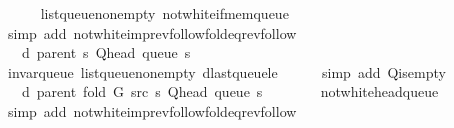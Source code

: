 \begin{isabellebody}
\ \ \ \ \isamarkupfalse%
\ list{\isacharunderscore}{\kern0pt}queue{\isacharunderscore}{\kern0pt}non{\isacharunderscore}{\kern0pt}empty\ not{\isacharunderscore}{\kern0pt}white{\isacharunderscore}{\kern0pt}if{\isacharunderscore}{\kern0pt}mem{\isacharunderscore}{\kern0pt}queue\isanewline
\ \ \ \ \isamarkupfalse%
\ {\isacharparenleft}{\kern0pt}simp\ add{\isacharcolon}{\kern0pt}\ not{\isacharunderscore}{\kern0pt}white{\isacharunderscore}{\kern0pt}imp{\isacharunderscore}{\kern0pt}rev{\isacharunderscore}{\kern0pt}follow{\isacharunderscore}{\kern0pt}fold{\isacharunderscore}{\kern0pt}eq{\isacharunderscore}{\kern0pt}rev{\isacharunderscore}{\kern0pt}follow{\isacharparenright}{\kern0pt}\isanewline
\ \ \isamarkupfalse%
\ \isamarkupfalse%
\ {\isachardoublequoteopen}{\isachardot}{\kern0pt}{\isachardot}{\kern0pt}{\isachardot}{\kern0pt}\ {\isasymle}\ d\ {\isacharparenleft}{\kern0pt}parent\ s{\isacharparenright}{\kern0pt}\ {\isacharparenleft}{\kern0pt}Q{\isacharunderscore}{\kern0pt}head\ {\isacharparenleft}{\kern0pt}queue\ s{\isacharparenright}{\kern0pt}{\isacharparenright}{\kern0pt}\ {\isacharplus}{\kern0pt}\ {}{\isachardoublequoteclose}\isanewline
\ \ \ \ \isamarkupfalse%
\ invar{\isacharunderscore}{\kern0pt}queue\ list{\isacharunderscore}{\kern0pt}queue{\isacharunderscore}{\kern0pt}non{\isacharunderscore}{\kern0pt}empty\ d{\isacharunderscore}{\kern0pt}last{\isacharunderscore}{\kern0pt}queue{\isacharunderscore}{\kern0pt}le\isanewline
\ \ \ \ \isamarkupfalse%
\ {\isacharparenleft}{\kern0pt}simp\ add{\isacharcolon}{\kern0pt}\ Q{\isachardot}{\kern0pt}is{\isacharunderscore}{\kern0pt}empty{\isacharparenright}{\kern0pt}\isanewline
\ \ \isamarkupfalse%
\ \isamarkupfalse%
\ {\isachardoublequoteopen}{\isachardot}{\kern0pt}{\isachardot}{\kern0pt}{\isachardot}{\kern0pt}\ {\isacharequal}{\kern0pt}\ d\ {\isacharparenleft}{\kern0pt}parent\ {\isacharparenleft}{\kern0pt}fold\ G\ src\ s{\isacharparenright}{\kern0pt}{\isacharparenright}{\kern0pt}\ {\isacharparenleft}{\kern0pt}Q{\isacharunderscore}{\kern0pt}head\ {\isacharparenleft}{\kern0pt}queue\ s{\isacharparenright}{\kern0pt}{\isacharparenright}{\kern0pt}\ {\isacharplus}{\kern0pt}\ {}{\isachardoublequoteclose}\isanewline
\ \ \ \ \isamarkupfalse%
\ not{\isacharunderscore}{\kern0pt}white{\isacharunderscore}{\kern0pt}head{\isacharunderscore}{\kern0pt}queue\isanewline
\ \ \ \ \isamarkupfalse%
\ {\isacharparenleft}{\kern0pt}simp\ add{\isacharcolon}{\kern0pt}\ not{\isacharunderscore}{\kern0pt}white{\isacharunderscore}{\kern0pt}imp{\isacharunderscore}{\kern0pt}rev{\isacharunderscore}{\kern0pt}follow{\isacharunderscore}{\kern0pt}fold{\isacharunderscore}{\kern0pt}eq{\isacharunderscore}{\kern0pt}rev{\isacharunderscore}{\kern0pt}follow{\isacharparenright}{\kern0pt}\isanewline

\end{isabellebody}
